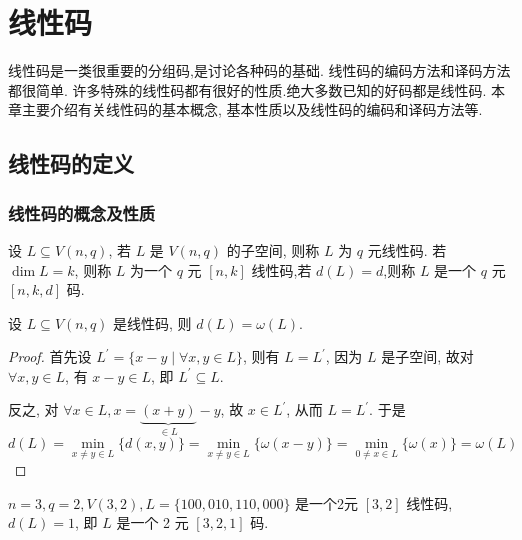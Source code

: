 \chapter{线性码}
线性码是一类很重要的分组码,是讨论各种码的基础. 线性码的编码方法和译码方法都很简单. 许多特殊的线性码都有很好的性质.绝大多数已知的好码都是线性码.
本章主要介绍有关线性码的基本概念, 基本性质以及线性码的编码和译码方法等.

\section{线性码的定义}

\subsection{线性码的概念及性质}

\begin{definition}
    设 $ L \subseteq V(n, q) $, 若 $ L $ 是 $ V(n, q) $ 的子空间, 则称 $ L $ 为 $ q $ 元线性码. 若 $ \operatorname{dim} L=k $, 则称 $ L $ 为一个 $ q $ 元 $ [n, k] $ 线性码,若 $ d(L)=d $,则称 $ L $ 是一个 $ q $ 元 $ [n, k, d] $ 码.
\end{definition}

\begin{theorem}
    设 $ L \subseteq V(n, q) $ 是线性码, 则 $ d(L)=\omega(L) $.
\end{theorem}
\begin{proof}
    首先设 $ L^{\prime}=\{x-y \mid \forall x, y \in L\} $, 则有 $ L=L^{\prime} $, 因为 $ L $ 是子空间, 故对 $ \forall x, y \in L $, 有 $ x-y \in L $, 即 $ L^{\prime} \subseteq L $.

    反之, 对 $ \forall x \in L, x=\underbrace{(x+y)}_{\in L}-y $, 故 $ x \in L^{\prime} $, 从而 $ L=L^{\prime} $.
于是 
$$ d(L)=\min\limits _{x \neq y \in L}\{d(x, y)\} 
=\min\limits _{x \neq y \in L}\{\omega(x-y)\} 
=\min\limits _{0 \neq x \in L}\{\omega(x)\}=\omega(L)
$$
\end{proof}
\begin{example}
     $ n=3, q=2, V(3,2), L=\{100,010,110,000\} $ 是一个2元 $ [3,2] $ 线性码, $ d(L)=1 $, 即 $ L $ 是一个 2 元 $ [3,2,1] $ 码.
\end{example}

